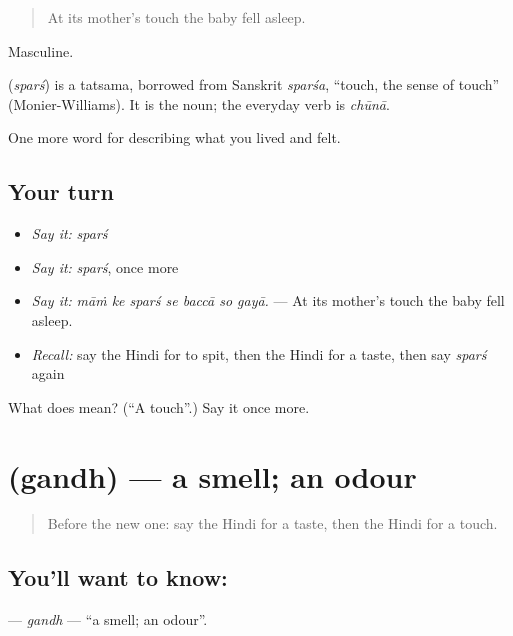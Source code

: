 \begin{quote}
At its mother's touch the baby fell asleep.
\end{quote}

Masculine.

\begin{cousinweb}
\textbf{} (\emph{sparś}) is a tatsama, borrowed from Sanskrit \emph{sparśa}, \textquotedblleft{}touch, the sense of touch\textquotedblright{} (Monier-Williams). It is the noun; the everyday verb is \emph{chūnā}.
\end{cousinweb}

\begin{grammarlens}[title={What you've built}]
One more word for describing what you lived and felt.
\end{grammarlens}

\subsection*{Your turn}
\begin{itemize}
\raggedright
  \item \emph{Say it:} \emph{sparś}
  \item \emph{Say it:} \emph{sparś}, once more
  \item \emph{Say it:} \emph{māṁ ke sparś se baccā so gayā.} — At its mother's touch the baby fell asleep.
  \item \emph{Recall:} say the Hindi for to spit, then the Hindi for a taste, then say \emph{sparś} again
\end{itemize}

\begin{tcolorbox}[breakable,colback=teal!4,colframe=teal!35!black,title={Before you move on}]
What does  mean? (\textquotedblleft{}A touch\textquotedblright{}.) Say it once more.
\end{tcolorbox}
\section[\texorpdfstring{\hi{गंध} (gandh)}{गंध (gandh)}]{ (gandh) — a smell; an odour}

\label{lesson:HI-C480-gandh}



\begin{quote}
Before the new one: say the Hindi for a taste, then the Hindi for a touch.
\end{quote}

\subsection*{You'll want to know: }
\textbf{} — \emph{gandh} — \textquotedblleft{}a smell; an odour\textquotedblright{}.

